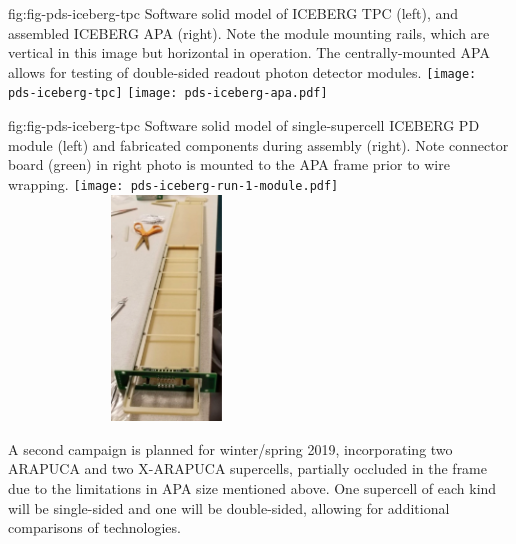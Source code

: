 
 \begin{dunefigure}
 {fig:fig-pds-iceberg-tpc}
 {Software solid model of ICEBERG TPC (left), and assembled ICEBERG APA (right).  Note the  module mounting rails, which are vertical in this image but horizontal in operation. The centrally-mounted APA allows for testing of double-sided readout photon detector modules.}
\texttt{[image: pds-iceberg-tpc]}
\texttt{[image: pds-iceberg-apa.pdf]}
\end{dunefigure}



\begin{dunefigure}
 {fig:fig-pds-iceberg-tpc}
 {Software solid model of single-supercell ICEBERG PD module (left) and fabricated components during assembly (right).  Note connector board (green) in right photo is mounted to the APA frame prior to wire wrapping.}
\texttt{[image: pds-iceberg-run-1-module.pdf]}
\includegraphics[angle=0,width=8.4cm,height=6cm]{graphics/pds-iceberg-module-assembly-photo.pdf}
\end{dunefigure}

A second campaign is planned for winter/spring 2019, incorporating two ARAPUCA and two X-ARAPUCA supercells, partially occluded in the frame due to the limitations in APA size mentioned above.  One supercell of each kind will be single-sided and one will be double-sided, allowing for additional comparisons of  technologies.

